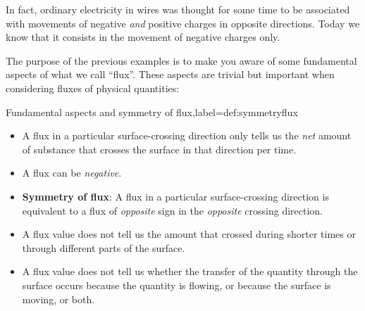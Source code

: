 \documentclass[a4paper,12pt,%
onecolumn,oneside,%
british%
]{memoir}
\renewcommand*{\|}[1][]{\nonscript\:#1\vert\nonscript\:\mathopen{}}
\begin{document}
%
In fact, ordinary electricity in wires was thought for some time to be associated with movements of negative \emph{and} positive charges in opposite directions. Today we know that it consists in the movement of negative charges only.

\medskip

The purpose of the previous examples is to make you aware of some fundamental aspects of what we call \enquote{flux}. These aspects are trivial but important when considering fluxes of physical quantities:
%
\begin{definition}{Fundamental aspects and symmetry of flux,label={def:symmetryflux}}
  \begin{itemize}[nosep]
  \item A flux in a particular surface-crossing direction only tells us the \emph{net} amount of substance that crosses the surface in that direction per time.

  \item A flux can be \emph{negative}.

  \item \textbf{Symmetry of flux}: A flux in a particular surface-crossing direction is equivalent to a flux of \emph{opposite} sign in the \emph{opposite} crossing direction.
  \end{itemize}
\end{definition}%
%
%

\begin{warning}
  \begin{itemize}[nosep]
  \item A flux value does not tell us the amount that crossed during shorter times or through different parts of the surface.

\item A flux value does not tell us whether the transfer of the quantity through the surface occurs because the quantity is flowing, or because the surface is moving, or both.
  \end{itemize}
\end{warning}
\end{document}
